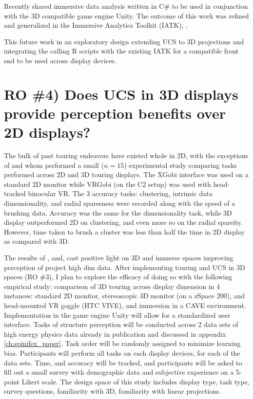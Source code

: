 \documentclass{monashthesis}
\begin{document}
Recently \textcite{cordeil_imaxes:_2017} shared immersive data analysis
written in C\# to be used in conjunction with the 3D compatible game
engine Unity. The outcome of this work was refined and generalized in
the Immersive Analytics Toolkit (IATK),
\textcite{cordeil_immersive_2019}.

This future work in an exploratory design extending UCS to 3D
projections and integrating the calling R scripts with the existing IATK
for a compatible front end to be used across display devices.

\section{RO \#4) Does UCS in 3D displays provide perception benefits
over 2D displays?}\label{UCS_3dvs2d}

The bulk of past touring endeavors have existed whole in 2D, with the
exceptions of \textcite{nelson_xgobi_1998} and
\textcite{arms_benefits_1999} whom performed a small (\(n=15\))
experimental study comparing tasks performed across 2D and 3D touring
displays. The XGobi interface was used on a standard 2D monitor while
VRGobi (on the C2 setup) was used with head-tracked binocular VR. The 3
accuracy tasks: clustering, intrinsic data dimensionality, and radial
sparseness were recorded along with the speed of a brushing data.
Accuracy was the same for the dimensionality task, while 3D display
outperformed 2D on clustering, and even more so on the radial sparsity.
However, time taken to brush a cluster was less than half the time in 2D
display as compared with 3D.

The results of \textcite{wagner_filho_immersive_2018},
\textcite{nelson_xgobi_1998} and, \textcite{arms_benefits_1999} cast
positive light on 3D and immerse spaces improving perception of project
high dim data. After implementing touring and UCS in 3D spaces (RO \#3),
I plan to explore the efficacy of doing so with the following empirical
study: comparison of 3D touring across display dimension in 4 instances:
standard 2D monitor, stereoscopic 3D monitor (on a zSpace 200), and
head-mounted VR goggle (HTC VIVE), and immersion in a CAVE environment.
Implementation in the game engine Unity will allow for a standardized
user interface. Tasks of structure perception will be conducted across 2
data sets of high energy physics data already in publication
\autocites{wang_visualizing_2018}{cook_dynamical_2018} and discussed in
appendix \ref{ch:spinifex_paper}. Task order will be randomly assigned
to minimize learning bias. Participants will perform all tasks on each
display devices, for each of the data sets. Time, and accuracy will be
tracked, and participants will be asked to fill out a small survey with
demographic data and subjective experience on a 5-point Likert scale.
The design space of this study includes display type, task type, survey
questions, familiarity with 3D, familiarity with linear projections.
\end{document}
